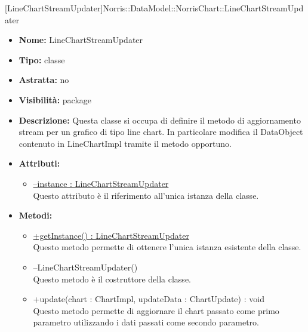			
			[LineChartStreamUpdater]{Norris::DataModel::NorrisChart::LineChartStreamUpdater}
			

	
			
			\begin{itemize}
			\item \textbf{Nome:} LineChartStreamUpdater
			\item \textbf{Tipo:} classe
			
		\item \textbf{Astratta:}
		no
			\item \textbf{Visibilità:} package
			\item \textbf{Descrizione:} Questa classe si occupa di definire il metodo di aggiornamento stream per un grafico di tipo line chart. In particolare modifica il DataObject contenuto in LineChartImpl tramite il metodo opportuno.
			\item \textbf{Attributi:}
				\begin{itemize}
				\setlength{\itemsep}{5pt}
				
					\item[\ding{111}] \underline{--instance : LineChartStreamUpdater} \\ [1mm] Questo attributo è il riferimento all'unica istanza della classe.
				\end{itemize}
		
			\item \textbf{Metodi:}
				\begin{itemize}
				\setlength{\itemsep}{5pt}
				
					\item[\ding{111}] {\underline{+getInstance() : LineChartStreamUpdater}} \\ [1mm] Questo metodo permette di ottenere l'unica istanza esistente della classe.
					\item[\ding{111}] {{--LineChartStreamUpdater()}} \\ [1mm] Questo metodo è il costruttore della classe.
					\item[\ding{111}] {{+update(chart : ChartImpl, updateData : ChartUpdate) : void}} \\ [1mm] Questo metodo permette di aggiornare il chart passato come primo parametro utilizzando i dati passati come secondo parametro.
				\end{itemize}
		
			\end{itemize}


